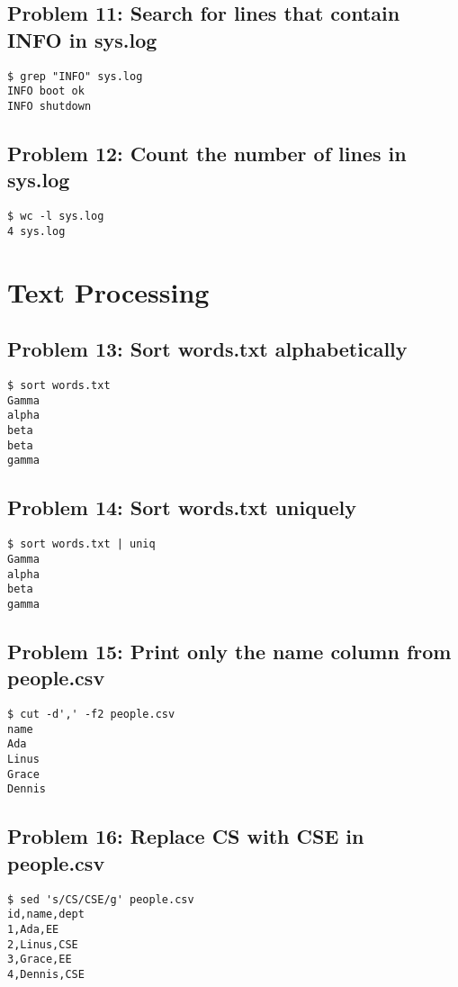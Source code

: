 \subsection*{Problem 11: Search for lines that contain INFO in sys.log}
\begin{verbatim}
$ grep "INFO" sys.log
INFO boot ok
INFO shutdown
\end{verbatim}

\subsection*{Problem 12: Count the number of lines in sys.log}
\begin{verbatim}
$ wc -l sys.log
4 sys.log
\end{verbatim}

\section{Text Processing}

\subsection*{Problem 13: Sort words.txt alphabetically}
\begin{verbatim}
$ sort words.txt
Gamma
alpha
beta
beta
gamma
\end{verbatim}

\subsection*{Problem 14: Sort words.txt uniquely}
\begin{verbatim}
$ sort words.txt | uniq
Gamma
alpha
beta
gamma
\end{verbatim}

\subsection*{Problem 15: Print only the name column from people.csv}
\begin{verbatim}
$ cut -d',' -f2 people.csv
name
Ada
Linus
Grace
Dennis
\end{verbatim}

\subsection*{Problem 16: Replace CS with CSE in people.csv}
\begin{verbatim}
$ sed 's/CS/CSE/g' people.csv
id,name,dept
1,Ada,EE
2,Linus,CSE
3,Grace,EE
4,Dennis,CSE
\end{verbatim}

